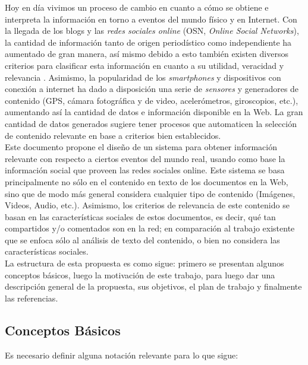 \documentclass[11pt]{article}
\begin{document}
  Hoy en día vivimos un proceso de cambio en cuanto a cómo se obtiene
  e interpreta la información en torno a eventos del mundo físico y en
  Internet. Con la llegada de los blogs y las \emph{redes sociales online}
  (OSN, \emph{Online Social Networks}), la cantidad de información tanto de
  origen periodístico como independiente ha aumentado de gran manera,
  así mismo debido a esto también existen diversos criterios para
  clasificar esta información en cuanto a su utilidad, veracidad y
  relevancia \cite{selecting}. Asimismo, la popularidad de los
  \emph{smartphones} y dispositivos con conexión a internet ha dado a
  disposición una serie de \emph{sensores} y generadores de contenido (GPS,
  cámara fotográfica y de video, acelerómetros, giroscopios, etc.),
  aumentando así la cantidad de datos e información disponible en la
  Web. La gran cantidad de datos generados sugiere tener procesos que 
  automaticen la selección de contenido relevante en base a criterios
  bien establecidos. \\

  Este documento propone el diseño de un sistema para obtener
  información relevante con respecto a ciertos eventos del mundo real,
  usando como base la información social que proveen las redes
  sociales online. Este sistema se basa principalmente no sólo en el
  contenido en texto de los documentos en la Web, sino que de modo más
  general considera cualquier tipo de contenido (Imágenes, Videos,
  Audio, etc.). Asimismo, los criterios de relevancia de este
  contenido se basan en las características sociales de estos
  documentos, es decir, qué tan compartidos y/o comentados son en la
  red; en comparación al trabajo existente que se enfoca sólo
  al análisis de texto del contenido, o bien no considera las
  características sociales. \\

  La estructura de esta propuesta es como sigue: primero se presentan
  algunos conceptos básicos, luego la motivación de este trabajo, para
  luego dar una descripción general de la propuesta, sus objetivos, el
  plan de trabajo y finalmente las referencias.


\subsection{Conceptos Básicos}
\label{sec-1.1}


Es necesario definir alguna notación relevante para lo que sigue:
\end{document}

